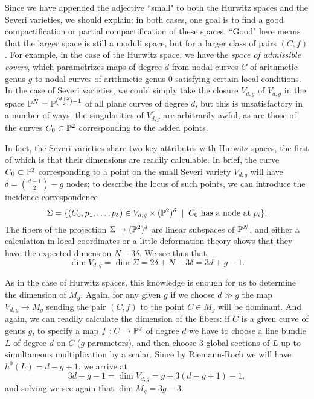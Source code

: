 Since we have appended the adjective ``small" to both the Hurwitz spaces and the Severi varieties, we should explain: in both cases, one goal is to find a good compactification or partial compactification of these spaces. ``Good" here means that the larger space is still a moduli space, but for a larger class of pairs $(C,f)$. For example, in the case of the Hurwitz space, we have the \emph{space of admissible covers}, which parametrizes  maps of degree $d$ from nodal curves $C$ of arithmetic genus $g$ to nodal curves of arithmetic genus 0 satisfying certain local conditions. In the case of Severi varieties, we could simply take the closure $\overline{V_{d,g}}$ of $V_{d,g}$ in the space $\PP^N = \PP^{\binom{d+2}{2}-1}$ of all plane curves of degree $d$, but this is unsatisfactory in a number of ways: the singularities of $\overline{V_{d,g}}$ are arbitrarily awful, as are those of the curves $C_0 \subset \PP^2$ corresponding to the added points.

In fact, the Severi varieties share two key attributes with Hurwitz spaces, the first of which is that their dimensions are readily calculable. In brief, the curve $C_0 \subset \PP^2$ corresponding to a point on the small Severi variety $V_{d,g}$ will have $\delta = \binom{d-1}{2} - g$ nodes; to describe the locus of such points, we can introduce the incidence correspondence
$$
\Sigma = \{(C_0,p_1,\dots,p_\delta) \in V_{d,g} \times (\PP^2)^\delta \; \mid \; C_0 \text{ has a node at $p_i$} \}.
$$
The fibers of the projection $\Sigma \to (\PP^2)^\delta$ are linear subspaces of $\PP^N$, and either a calculation in local coordinates or a little deformation theory shows that they have the expected dimension $N - 3\delta$. We see thus that
$$
\dim V_{d,g} = \dim \Sigma = 2\delta + N - 3\delta = 3d+g-1.
$$

As in the case of Hurwitz spaces, this knowledge is enough for us to determine the dimension of $M_g$. Again, for any given $g$ if we choose $d \gg g$ the map $V_{d,g} \to M_g$ sending the pair $(C, f)$ to the point $C \in M_g$ will be dominant. And again, we can readily calculate the dimension of the fibers: if $C$ is a given curve of genus $g$, to specify a map $f : C \to \PP^2$ of degree $d$ we have to choose a line bundle $L$ of degree $d$ on $C$ ($g$ parameters), and then choose 3 global sections of $L$ up to simultaneous multiplication by a scalar. Since by Riemann-Roch we will have $h^0(L) = d-g+1$, we arrive at
$$
3d+g-1 = \dim V_{d,g}  = g + 3(d-g+1) - 1,
$$
and solving we see again that $\dim M_g = 3g-3$.

